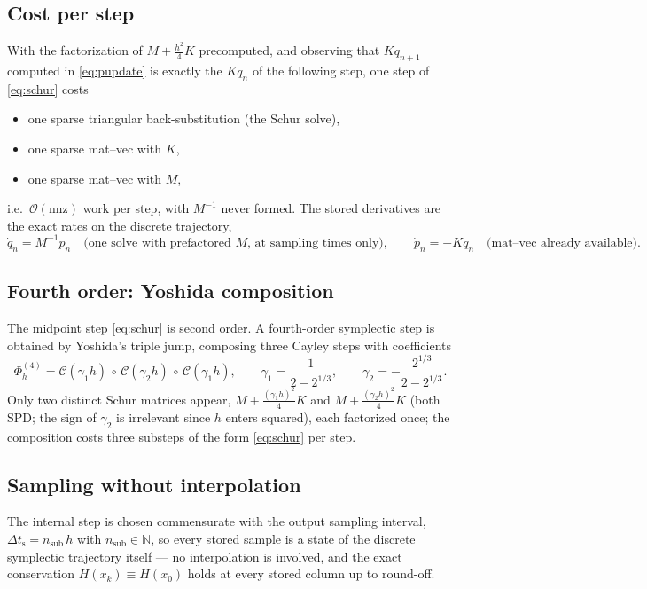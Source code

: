 \subsection{Cost per step}

With the factorization of $M + \tfrac{h^2}{4}K$ precomputed, and observing
that $K q_{n+1}$ computed in \eqref{eq:pupdate} is exactly the $K q_n$ of
the following step, one step of \eqref{eq:schur} costs
\begin{itemize}
  \item one sparse triangular back-substitution (the Schur solve),
  \item one sparse mat--vec with $K$,
  \item one sparse mat--vec with $M$,
\end{itemize}
i.e.\ $\mathcal{O}(\mathrm{nnz})$ work per step, with $M^{-1}$ never formed.
The stored derivatives are the exact rates on the discrete trajectory,
\begin{equation}
  \dot q_n = M^{-1} p_n
  \quad\text{(one solve with prefactored } M \text{, at sampling times only)},
  \qquad
  \dot p_n = -K q_n
  \quad\text{(mat--vec already available)}.
\end{equation}

\subsection{Fourth order: Yoshida composition}

The midpoint step \eqref{eq:schur} is second order. A fourth-order
symplectic step is obtained by Yoshida's triple jump, composing three
Cayley steps with coefficients
\begin{equation}
  \Phi_h^{(4)}
  = \mathcal{C}(\gamma_1 h)\,\circ\,\mathcal{C}(\gamma_2 h)\,\circ\,
    \mathcal{C}(\gamma_1 h),
  \qquad
  \gamma_1 = \frac{1}{2 - 2^{1/3}},
  \qquad
  \gamma_2 = -\frac{2^{1/3}}{2 - 2^{1/3}} .
\end{equation}
Only two distinct Schur matrices appear,
$M + \tfrac{(\gamma_1 h)^2}{4} K$ and $M + \tfrac{(\gamma_2 h)^2}{4} K$
(both SPD; the sign of $\gamma_2$ is irrelevant since $h$ enters squared),
each factorized once; the composition costs three substeps of the form
\eqref{eq:schur} per step.

\subsection{Sampling without interpolation}

The internal step is chosen commensurate with the output sampling interval,
$\Delta t_{\mathrm{s}} = n_{\mathrm{sub}}\, h$ with
$n_{\mathrm{sub}} \in \mathbb{N}$, so every stored sample is a state of the
discrete symplectic trajectory itself --- no interpolation is involved, and
the exact conservation $H(x_k) \equiv H(x_0)$ holds at every stored column
up to round-off.
